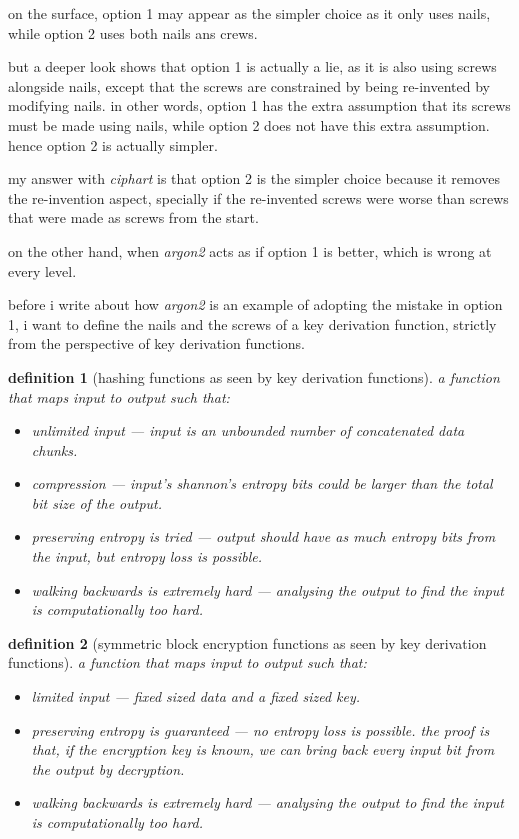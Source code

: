 \documentclass[twocolumn]{article}
\newtheorem{definition}{definition}
\begin{document}
on the surface, option 1 may appear as the simpler choice as it only uses
nails, while option 2 uses both nails ans crews.

but a deeper look shows that option 1 is actually a lie, as it is also
using screws alongside nails, except that the screws are constrained by
being re-invented by modifying nails.  in other words, option 1 has the
extra assumption that its screws must be made using nails, while option 2
does not have this extra assumption.  hence option 2 is actually simpler.

my answer with \emph{ciphart} is that option 2 is the simpler choice
because it removes the re-invention aspect, specially if the re-invented
screws were worse than screws that were made as screws from the start.

on the other hand, when \emph{argon2} acts as if option 1 is better, which
is wrong at every level.

before i write about how \emph{argon2} is an example of adopting the
mistake in option 1, i want to define the nails and the screws of a key
derivation function, strictly from the perspective of key derivation
functions.

\begin{definition}[hashing functions as seen by key derivation
functions]\label{def_kdf_hash}
    a function that maps input to output such that:
    \begin{itemize}
        \item unlimited input --- input is an unbounded number of
        concatenated data chunks.
        \item compression --- input's shannon's entropy bits could be
        larger than the total bit size of the output.
        \item preserving entropy is tried --- output should have as much
        entropy bits from the input, but entropy loss is possible.
        \item walking backwards is extremely hard --- analysing the output
        to find the input is computationally too hard.
    \end{itemize}
\end{definition}

\begin{definition}[symmetric block encryption functions as seen by key
derivation functions]\label{def_kdf_enc}
    a function that maps input to output such that:
    \begin{itemize}
        \item limited input --- fixed sized data and a fixed sized
        key.
        \item preserving entropy is guaranteed --- no entropy loss is
        possible.  the proof is that, if the encryption key is known, we
        can bring back every input bit from the output by decryption.
        \item walking backwards is extremely hard --- analysing the output
        to find the input is computationally too hard.
    \end{itemize}
\end{definition}
\end{document}

